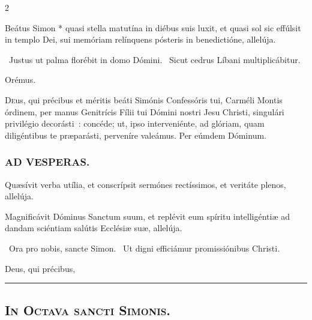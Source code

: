 \documentclass[9pt,twoside]{extarticle}
\begin{document}
\begin{multicols}{2}
{{\begin{tightlist}{}
\item {} Beátus Simon * quasi stella matutína in diébus suis luxit, et quasi sol sic effúlsit in templo Dei, sui memóriam relínquens pósteris in benedictióne, allelúja.
\item {}~Justus ut palma florébit in domo Dómini. ~Sicut cedrus Líbani multiplicábitur.
\item Orémus. \hfill {}
\end{tightlist}
\lettrine{D}eus, qui précibus et méritis beáti Simónis Confessóris tui, Carméli Montis órdinem, per manus Genitrícis Fílii tui Dómini nostri Jesu Christi, singulári privilégio decorásti~: concéde; ut, ipso interveniénte, ad glóriam, quam diligéntibus te præparásti, perveníre valeámus. Per eúmdem Dóminum.

\subsubsection*{\center \textsc{AD VESPERAS.}}
\begin{tightlist}{}
\item {}
\item {}
\item {} Quæsívit verba utília, et conscrípsit sermónes rectíssimos, et veritáte plenos, allelúja.
\item {} Magnificávit Dóminus Sanctum suum, et replévit eum spíritu intelligéntiæ ad dandam sciéntiam salútis Ecclésiæ suæ, allelúja.
\item {}~Ora pro nobis, sancte Simon. ~Ut digni efficiámur promissiónibus Christi.
\item {} Deus, qui précibus, 
\end{tightlist}

\begin{center}\textcolor{red}{\rule{\linewidth}{0.5pt}} \end{center}

\subsubsection*{\center {}}
\subsection*{\center \textsc{In Octava sancti Simonis.}}
}}
\end{multicols}
\end{document}
